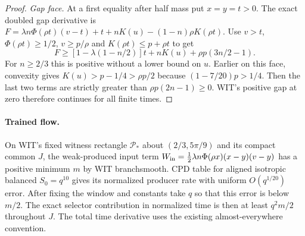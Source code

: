 \documentclass[11pt]{article}
\begin{document}
\begin{proof}
\emph{Gap face.} At a first equality after half mass put $x=y=t>0$.
The exact doubled gap derivative is
$F=\lambda n\Phi(\rho t)(v-t)+t+nK(u)-(1-n)\rho K(\rho t)$.
Use $v>t$, $\Phi(\rho t)\ge1/2$, $v\ge p/\rho$ and
$K(\rho t)\le p+\rho t$ to get
\begin{equation}\label{an01pbv1:face}
 F\ge [1-\lambda(1-n/2)]t+nK(u)+\rho p(3n/2-1).
\end{equation}
For $n\ge2/3$ this is positive without a lower bound on $u$.
Earlier on this face, convexity gives $K(u)>p-1/4>\rho p/2$
because $(1-7/20)p>1/4$. Then the last two terms are strictly
greater than $\rho p(2n-1)\ge0$. WIT's positive gap at zero
therefore continues for all finite times.
\end{proof}

\paragraph{Trained flow.}\label{an01pbv1:transfer}
On WIT's fixed witness rectangle $\mathcal P_*$ about $(2/3,5\pi/9)$
and its compact common $J$, the weak-produced input term
$W_{\rm in}=\tfrac12\lambda n\Phi(\rho x)(x-y)(v-y)$ has a positive
minimum $m$ by WIT branchsmooth. CPD table for aligned isotropic
balanced $S_0=q^{10}$ gives its normalized producer rate with uniform
$O(q^{1/20})$ error. After fixing the window and constants take $q$
so that this error is below $m/2$. The exact selector contribution
in normalized time is then at least $q^2m/2$ throughout $J$.
The total time derivative uses the existing almost-everywhere convention.
\end{document}

